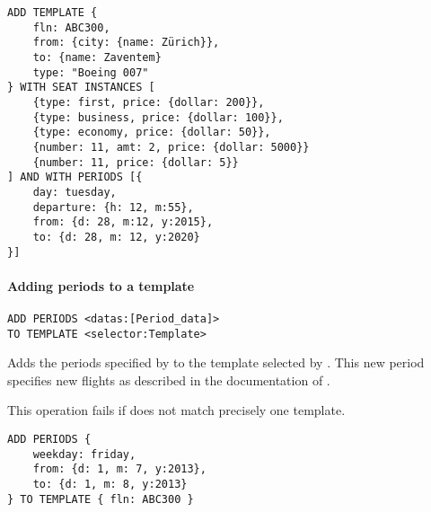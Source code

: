 \begin{texa}
  \begin{lstlisting}
ADD TEMPLATE {
    fln: ABC300,
    from: {city: {name: Zürich}},
    to: {name: Zaventem}
    type: "Boeing 007"
} WITH SEAT INSTANCES [
    {type: first, price: {dollar: 200}},
    {type: business, price: {dollar: 100}},
    {type: economy, price: {dollar: 50}},
    {number: 11, amt: 2, price: {dollar: 5000}}
    {number: 11, price: {dollar: 5}}
] AND WITH PERIODS [{
    day: tuesday,
    departure: {h: 12, m:55},
    from: {d: 28, m:12, y:2015},
    to: {d: 28, m: 12, y:2020}
}]
  \end{lstlisting}
\end{texa}

\paragraph{Adding periods to a template}
\begin{operation}
  \label{op:add_periods}
  \begin{lstlisting}
ADD PERIODS <datas:[Period_data]>
TO TEMPLATE <selector:Template>
  \end{lstlisting}
\end{operation}
Adds the periods specified by  to the template selected by
. This new period specifies new flights as described in the
documentation of .

This operation fails if  does not match precisely one template.

\begin{texa}
  \begin{lstlisting}
ADD PERIODS {
    weekday: friday,
    from: {d: 1, m: 7, y:2013},
    to: {d: 1, m: 8, y:2013}
} TO TEMPLATE { fln: ABC300 }
  \end{lstlisting}
\end{texa}


